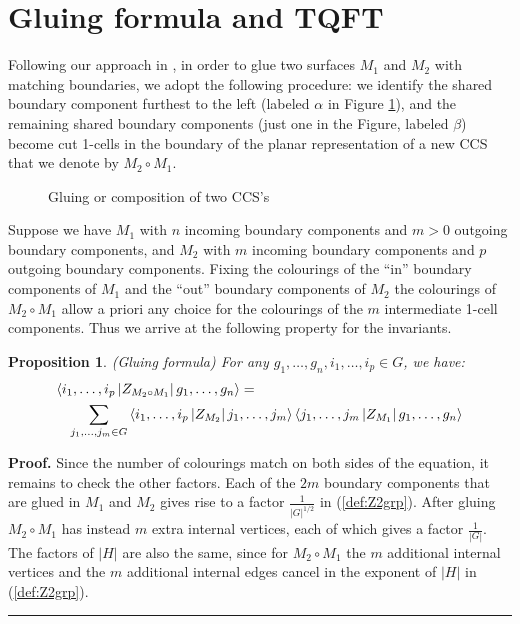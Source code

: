 \documentclass[a4paper,11pt]{article}
\newtheorem{Proposition}[Theorem]{Proposition}
\newenvironment{Proof}[1][Proof]{\textbf{#1.} }{\ \rule{0.5em}{0.5em}}
\begin{document}
\section{Gluing formula and TQFT}
\label{sec:glue}

Following our approach in \cite{bp1}, in order to glue two surfaces $M_1$ and $M_2$ with matching boundaries, we adopt the following procedure:
we identify the shared boundary component furthest to the left (labeled $\alpha$ in Figure \ref{fig:gluing}), and the remaining shared boundary components (just one in the Figure, labeled $\beta$) become cut 1-cells in the boundary of the planar representation of a new CCS that we denote by $M_2 \circ M_1$.

\begin{figure}[htbp] 
\centerline{\relabelbox 
\epsfxsize 10cm
\endrelabelbox}
\caption{Gluing or composition of two CCS's}
\label{fig:gluing}
\end{figure}





Suppose we have $M_1$ with $n$ incoming boundary components and $m>0$ outgoing boundary components, and $M_2$ with $m$ incoming boundary components and $p$ outgoing boundary components. Fixing the colourings of the ``in'' boundary components of $M_1$ and the ``out'' boundary components of $M_2$ the colourings of $M_2\circ M_1$ allow a priori any choice for the colourings of the $m$ intermediate 1-cell components. Thus we arrive at the following property for the invariants.

\begin{Proposition} (Gluing formula) For any $g_1, \dots , g_n, i_1,\dots ,i_p\in G$, we have:
\begin{eqnarray}
\lefteqn{\left \langle i_1,\dots , i_p \left | Z_{M_2\circ M_1} \right |g_1,\dots , g_n   \right \rangle =} \nonumber \\  
& &  \sum_{j_1,\dots , j_m\in G }  
\left \langle i_1,\dots , i_p \left | Z_{M_2} \right | j_1,\dots , j_m  \right \rangle  
\left \langle j_1,\dots , j_m \left | Z_{M_1} \right |g_1,\dots , g_n   \right \rangle 
\label{eq:gluing}
\end{eqnarray}
\end{Proposition}
%
\begin{Proof}
Since the number of colourings match on both sides of the equation, it remains to check the other factors. Each of the $2m$ boundary components that are glued in $M_1$ and $M_2$  
gives rise to a factor $\frac{1}{|G|^{1/2}}$ in (\ref{def:Z2grp}). After gluing $M_2\circ M_1$ has instead $m$ extra internal vertices, each of which gives a factor $\frac{1}{|G|}$. The factors of $|H|$ are also the same, since for  $M_2\circ M_1$ the $m$ additional internal vertices and the $m$ additional internal edges cancel in the exponent of $|H|$ in (\ref{def:Z2grp}).
\end{Proof} 
\vskip 0.2cm
\end{document}
